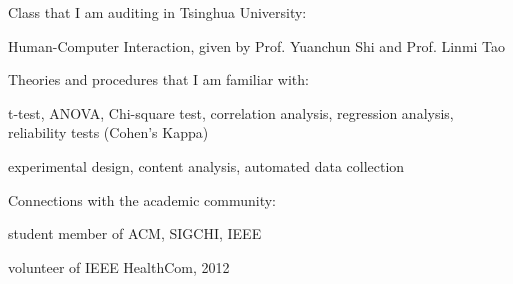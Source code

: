 \documentclass[margin,line]{resume}
\begin{document}
\begin{resume}
\begin{list2}
    \end{list2}
        
    Class that I am auditing in Tsinghua University:
    \begin{list2}
    \item Human-Computer Interaction, given by Prof. Yuanchun Shi and Prof. Linmi Tao
    \end{list2}
    
    Theories and procedures that I am familiar with:
    \begin{list2}
    \item t-test, ANOVA, Chi-square test, correlation analysis, regression analysis, reliability tests (Cohen's Kappa)
    \item experimental design, content analysis, automated data collection
    \end{list2}
    
    Connections with the academic community:
    \begin{list2}
    \item student member of ACM, SIGCHI, IEEE
    \item volunteer of IEEE HealthCom, 2012
    \end{list2}
    

\end{resume}
\end{document}
